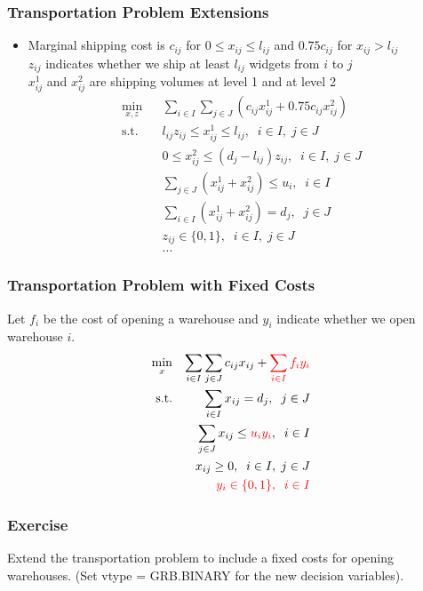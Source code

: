 \documentclass[12pt,handout]{beamer}
\begin{document}
\begin{frame}
\frametitle{Transportation Problem Extensions}
\begin{itemize}
\item Marginal shipping cost is $c_{ij}$ for $0 \le x_{ij} \le l_{ij}$ and $0.75c_{ij}$ for $x_{ij} > l_{ij}$ \\
$z_{ij}$ indicates whether we ship at least $l_{ij}$ widgets from $i$ to $j$ \\
$x_{ij}^1$ and $x_{ij}^2$ are shipping volumes at level 1 and at level 2
\begin{eqnarray}
\min_{x,z} && \sum_{i \in I} \sum_{j \in J} (c_{ij} x_{ij}^1 + 0.75 c_{ij} x_{ij}^2) \nonumber \\
\mbox{s.t.} && l_{ij} z_{ij} \le x_{ij}^1 \le l_{ij},\;\;i \in I,\;j \in J \nonumber \\
&& 0 \le x_{ij}^2 \le (d_j - l_{ij}) z_{ij},\;\;i \in I,\;j \in J \nonumber \\
&& \sum_{j \in J} (x_{ij}^1 + x_{ij}^2) \le u_i,\;\;i \in I \nonumber \\
&& \sum_{i \in I} (x_{ij}^1 + x_{ij}^2) = d_j,\;\;j \in J \nonumber \\
&& z_{ij} \in \{0,1\},\;\;i \in I,\;j \in J \nonumber \\
&& ... \nonumber
\end{eqnarray}
\end{itemize}
\end{frame}

\begin{frame}
\frametitle{Transportation Problem with Fixed Costs}
Let $f_i$ be the cost of opening a warehouse and $y_i$ indicate whether we open warehouse $i$.
\begin{eqnarray}
\min_{x} && \sum_{i \in I} \sum_{j \in J} c_{ij} x_{ij} + {\color{red} \sum_{i \in I} f_i y_i} \nonumber \\
\mbox{s.t.} && \sum_{i \in I} x_{ij} = d_j,\;\;j \in J \nonumber \\
&& \sum_{j \in J} x_{ij} \le {\color{red} u_i y_i},\;\;i \in I \nonumber \\
&& x_{ij} \ge 0, \;\;i \in I,\;j \in J \nonumber \\
&& {\color{red} y_i \in \{0, 1\},\;\;i \in I} \nonumber
\end{eqnarray}
\end{frame}

{
\begin{frame}
\frametitle{Exercise}
Extend the transportation problem to include a fixed costs for opening warehouses. (Set vtype = GRB.BINARY for the new decision variables).
\end{frame}
}
\end{document}
